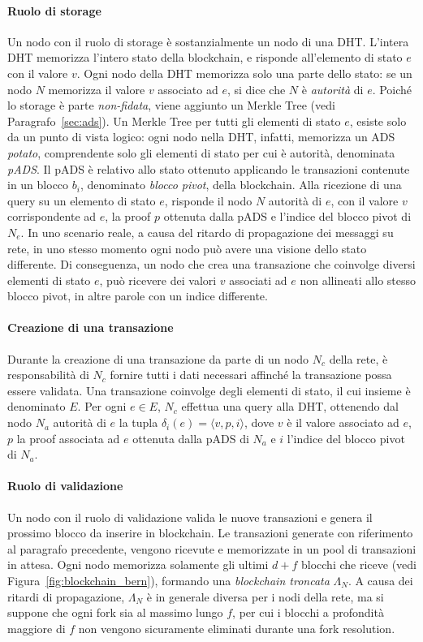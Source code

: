 \paragraph*{Ruolo di storage}
Un nodo con il ruolo di storage è sostanzialmente un nodo di una DHT. L'intera DHT memorizza l'intero stato della blockchain, e risponde all'elemento di stato $e$ con il valore $v$. Ogni nodo della DHT memorizza solo una parte dello stato: se un nodo $N$ memorizza il valore $v$ associato ad $e$, si dice che $N$ è \emph{autorità} di $e$. Poiché lo storage è parte \emph{non-fidata}, viene aggiunto un Merkle Tree (vedi Paragrafo~\ref{sec:ads}). Un Merkle Tree per tutti gli elementi di stato $e$, esiste solo da un punto di vista logico: ogni nodo nella DHT, infatti, memorizza un ADS \emph{potato}, comprendente solo gli elementi di stato per cui è autorità, denominata \emph{pADS}. Il pADS è relativo allo stato ottenuto applicando le transazioni contenute in un blocco $b_i$, denominato \emph{blocco pivot}, della blockchain. Alla ricezione di una query su un elemento di stato $e$, risponde il nodo $N$ autorità di $e$, con il valore $v$ corrispondente ad $e$, la proof $p$ ottenuta dalla pADS e l'indice del blocco pivot di $N_e$.
In uno scenario reale, a causa del ritardo di propagazione dei messaggi su rete, in uno stesso momento ogni nodo può avere una visione dello stato differente. Di conseguenza, un nodo che crea una transazione che coinvolge diversi elementi di stato $e$, può ricevere dei valori $v$ associati ad $e$ non allineati allo stesso blocco pivot, in altre parole con un indice differente.

\paragraph*{Creazione di una transazione}
Durante la creazione di una transazione da parte di un nodo $N_c$ della rete, è responsabilità di $N_c$ fornire tutti i dati necessari affinché la transazione possa essere validata. Una transazione coinvolge degli elementi di stato, il cui insieme è denominato $E$. Per ogni $e \in E$, $N_c$ effettua una query alla DHT, ottenendo dal nodo $N_a$ autorità di $e$ la tupla $\delta_i(e) = \langle v, p, i \rangle$, dove $v$ è il valore associato ad $e$, $p$ la proof associata ad $e$ ottenuta dalla pADS di $N_a$ e $i$ l'indice del blocco pivot di $N_a$.

\paragraph*{Ruolo di validazione}
Un nodo con il ruolo di validazione valida le nuove transazioni e genera il prossimo blocco da inserire in blockchain. Le transazioni generate con riferimento al paragrafo precedente, vengono ricevute e memorizzate in un pool di transazioni in attesa. Ogni nodo memorizza solamente gli ultimi $d + f$ blocchi che riceve (vedi Figura~\ref{fig:blockchain_bern}), formando una \emph{blockchain troncata} $\Lambda_N$. A causa dei ritardi di propagazione, $\Lambda_N$ è in generale diversa per i nodi della rete, ma si suppone che ogni fork sia al massimo lungo $f$, per cui i blocchi a profondità maggiore di $f$ non vengono sicuramente eliminati durante una fork resolution.

